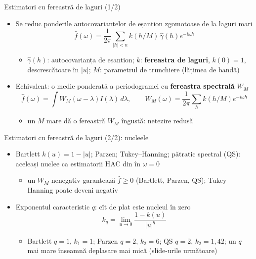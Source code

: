 \begin{frame}{Estimatori cu fereastră de laguri (1/2)}
\itemsize{\small}
\begin{itemize}
    \item Se reduc ponderile autocovarianțelor de eșantion zgomotoase de la laguri mari 
    \[ \hat f(\omega) = \frac{1}{2\pi}\sum_{|h| < n}k(h/M)\,\hat\gamma(h)e^{-i\omega h} \]
    \begin{itemize}
        \item $\hat\gamma(h)$: autocovarianța de eșantion; $k$: \textbf{fereastra de laguri}, $k(0) = 1$, descrescătoare în $|u|$; $M$: parametrul de trunchiere (lățimea de bandă)
    \end{itemize}
    \item Echivalent: o medie ponderată a periodogramei cu \textbf{fereastra spectrală} $W_M$
    \[ \hat f(\omega) = \int W_M(\omega - \lambda)I(\lambda)\,d\lambda, \qquad W_M(\omega) = \frac{1}{2\pi}\sum_h k(h/M)e^{-i\omega h} \]
    \begin{itemize}
        \item un $M$ mare dă o fereastră $W_M$ îngustă: netezire redusă
    \end{itemize}
\end{itemize}
\end{frame}

\begin{frame}{Estimatori cu fereastră de laguri (2/2): nucleele}
\itemsize{\small}
\begin{itemize}
    \item Bartlett $k(u) = 1 - |u|$; Parzen; Tukey--Hanning; pătratic spectral (QS): aceleași nuclee ca estimatorii HAC din  în $\omega = 0$
    \begin{itemize}
        \item un $W_M$ nenegativ garantează $\hat f \ge 0$ (Bartlett, Parzen, QS); Tukey--Hanning poate deveni negativ
    \end{itemize}
    \item Exponentul caracteristic $q$: cît de plat este nucleul în zero
    \[ k_q = \lim_{u \to 0}\frac{1 - k(u)}{|u|^q} \]
    \begin{itemize}
        \item Bartlett $q = 1$, $k_1 = 1$; Parzen $q = 2$, $k_2 = 6$; QS $q = 2$, $k_2 = 1{,}42$; un $q$ mai mare înseamnă deplasare mai mică (slide-urile următoare)
    \end{itemize}
\end{itemize}
\end{frame}


